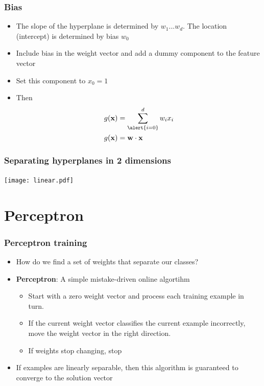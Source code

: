 \documentclass[14pt,mathserif]{beamer}
\newcommand{\x}{\mathbf{x}}
\newcommand{\w}{\mathbf{w}}
\begin{document}
\begin{frame}
 \frametitle{Bias}
\begin{itemize}
\item The slope of the hyperplane is determined by
  $w_1...w_d$. The location (intercept) is determined by  bias $w_0$
\item Include bias in the
  weight vector and add a dummy component to the feature vector
\item Set this component to $x_0 = 1$
\item Then 
 \begin{align}
 g(\x) & = \sum_{\alert{i=0}}^d w_i x_i\\
 g(\x) & = \w \cdot \x
\end{align}
\end{itemize}
\end{frame}

\begin{frame}
\label{hyperplanes}
 \begin{center}\frametitle{Separating hyperplanes in 2 dimensions}
\vskip -0.5cm 
\texttt{[image: linear.pdf]}
\end{center}
\end{frame}



\section{Perceptron}
\begin{frame}
 \frametitle{Perceptron training}
\begin{itemize}
 \item How do we find a set of weights that separate our classes?
\item \textbf{Perceptron}: A simple mistake-driven online algortihm
\begin{block}{}
\begin{itemize}
\item Start with a zero weight vector and process each training
  example in turn.
\item If the current weight vector classifies the current example
  incorrectly, move the weight vector in the right direction.
\item If weights stop changing, stop
\end{itemize}
\end{block}
\item If examples are linearly separable, then this algorithm is
  guaranteed to converge to the solution vector
\end{itemize}
\end{frame}
\end{document}
